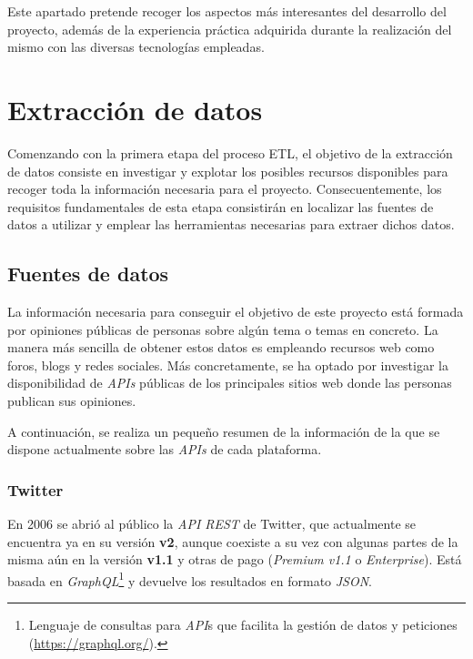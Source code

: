  \label{section:relevant_aspects}

Este apartado pretende recoger los aspectos más interesantes del desarrollo del proyecto, además de la experiencia práctica adquirida durante la
realización del mismo con las diversas tecnologías empleadas.

\section{Extracción de datos} \label{section:data_extraction}

Comenzando con la primera etapa del proceso ETL, el objetivo de la extracción de datos consiste en investigar y explotar los posibles recursos disponibles para recoger toda la información necesaria para el proyecto. Consecuentemente, los requisitos fundamentales de esta etapa consistirán en localizar las fuentes de datos a utilizar y emplear las herramientas necesarias para extraer dichos datos.

\subsection{Fuentes de datos}

La información necesaria para conseguir el objetivo de este proyecto está formada por opiniones públicas de personas sobre algún tema o temas en concreto. La manera más sencilla de obtener estos datos es empleando recursos web como foros, blogs y redes sociales. Más concretamente, se ha optado por investigar la disponibilidad de \textit{APIs} públicas de los principales sitios web donde las personas publican sus opiniones.

A continuación, se realiza un pequeño resumen de la información de la que se dispone actualmente sobre las \textit{APIs} de cada plataforma.

\subsubsection{Twitter}

En 2006 se abrió al público la \textit{API REST} \cite{twitterGettingStarted} de Twitter, que actualmente se encuentra ya en su versión \textbf{v2}, aunque coexiste a su vez con algunas partes de la misma aún en la versión \textbf{v1.1} y otras de pago (\textit{Premium v1.1} o \textit{Enterprise}). Está basada en \textit{GraphQL}\footnote{Lenguaje de consultas para \textit{API}s que facilita la gestión de datos y peticiones (\url{https://graphql.org/}).} y devuelve los resultados en formato \textit{JSON}.

